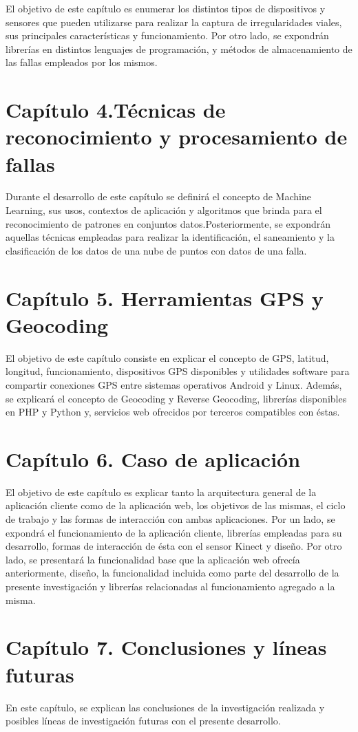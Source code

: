 El objetivo de este capítulo es enumerar los distintos tipos de dispositivos y sensores que pueden utilizarse para realizar la captura de irregularidades viales, sus principales características y funcionamiento. 
Por otro lado, se expondrán librerías en distintos lenguajes de programación, y métodos de almacenamiento de las fallas empleados por los mismos.

\section{Capítulo 4.Técnicas de reconocimiento y procesamiento de fallas}

Durante el desarrollo de este capítulo se definirá el concepto de Machine Learning, sus usos, contextos de aplicación y algoritmos que brinda para el reconocimiento de patrones en conjuntos datos.Posteriormente, se expondrán aquellas técnicas empleadas para realizar la identificación, el saneamiento y la clasificación de los datos de una nube de puntos con datos de una falla.

\section{Capítulo 5. Herramientas GPS y Geocoding}

El objetivo de este capítulo consiste en explicar el concepto de GPS, latitud, longitud, funcionamiento, dispositivos GPS disponibles y utilidades software para compartir conexiones GPS entre sistemas operativos Android y Linux.
Además, se explicará el concepto de Geocoding y Reverse Geocoding, librerías disponibles en PHP y Python y, servicios web ofrecidos por terceros compatibles con éstas.

\section{Capítulo 6. Caso de aplicación}

El objetivo de este capítulo es explicar tanto la arquitectura general de la aplicación cliente como de la aplicación web, los objetivos de las mismas, el ciclo de trabajo y las formas de interacción con ambas aplicaciones. 
Por un lado, se expondrá el funcionamiento de la aplicación cliente, librerías empleadas para su desarrollo, formas de interacción de ésta con el sensor Kinect y diseño.
Por otro lado, se presentará la funcionalidad base que la aplicación web ofrecía anteriormente, diseño, la funcionalidad incluida como parte del desarrollo de la presente investigación y librerías relacionadas al funcionamiento agregado a la misma. 

\section{Capítulo 7. Conclusiones y líneas futuras}

En este capítulo, se explican las conclusiones de la investigación realizada y posibles líneas de investigación futuras con el presente desarrollo.